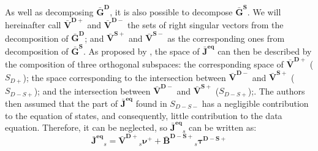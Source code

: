 			As well as decomposing $\mathbf{\bar{G}^D}$, it is also possible to decompose $\mathbf{\bar{G}^S}$. We will hereinafter call $\mathbf{\bar{V}^{D+}}$ and $\mathbf{\bar{V}^{D-}}$ the sets of right singular vectors from the decomposition of $\mathbf{\bar{G}^D}$; and $\mathbf{\bar{V}^{S+}}$ and $\mathbf{\bar{V}^{S-}}$ as the corresponding ones from decomposition of $\mathbf{\bar{G}^S}$. As proposed by \cite{zhong2009twofold}, the space of $\mathbf{\bar{J}^{eq}}$ can then be described by the composition of three orthogonal subspaces: the corresponding space of $\mathbf{\bar{V}^{D+}}$ ($S_{D+}$); the space corresponding to the intersection between $\mathbf{\bar{V}^{D-}}$ and $\mathbf{\bar{V}^{S+}}$ ($S_{D-S+}$); and the intersection between $\mathbf{\bar{V}^{D-}}$ and $\mathbf{\bar{V}^{S+}}$ ($S_{D-S+}$);. The authors then assumed that the part of $\mathbf{\bar{J}^{eq}}$ found in $S_{D-S-}$ has a negligible contribution to the equation of states, and consequently, little contribution to the data equation. Therefore, it can be neglected, so $\mathbf{\bar{J}^{eq}}_s$ can be written as:
			\begin{equation}
				\mathbf{\bar{J}^{eq}}_s = \mathbf{\bar{V}^{D+}}_s\boldsymbol{\nu}^+ + \mathbf{\bar{B}^{D-S+}}_s\boldsymbol{\tau^{D-S+}} \label{eq:3:deterministic:som:Jtwofold}
			\end{equation}
		
